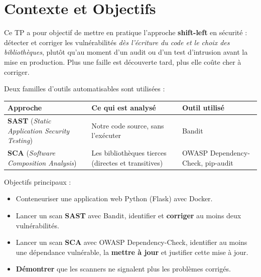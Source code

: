 \documentclass[11pt,a4paper]{article}
\begin{document}
\setcounter{page}{1}
\tableofcontents
\newpage

\section{Contexte et Objectifs}
Ce TP a pour objectif de mettre en pratique l'approche \textbf{\og shift-left \fg{}} en sécurité :
détecter et corriger les vulnérabilités \emph{dès l'écriture du code et le choix des bibliothèques},
plutôt qu'au moment d'un audit ou d'un test d'intrusion avant la mise en production. Plus une
faille est découverte tard, plus elle coûte cher à corriger.

Deux familles d'outils automatisables sont utilisées :

\begin{table}[H]
\centering
\begin{tabularx}{\textwidth}{@{}lLL@{}}
\toprule
\textbf{Approche} & \textbf{Ce qui est analysé} & \textbf{Outil utilisé} \\
\midrule
\textbf{SAST} (\emph{Static Application Security Testing}) & Notre code source, sans l'exécuter & Bandit \\
\textbf{SCA} (\emph{Software Composition Analysis}) & Les bibliothèques tierces (directes et transitives) & OWASP Dependency-Check, pip-audit \\
\bottomrule
\end{tabularx}
\end{table}

\noindent Objectifs principaux :
\begin{itemize}
  \item Conteneuriser une application web Python (Flask) avec Docker.
  \item Lancer un scan \textbf{SAST} avec Bandit, identifier et \textbf{corriger} au moins deux vulnérabilités.
  \item Lancer un scan \textbf{SCA} avec OWASP Dependency-Check, identifier au moins une dépendance
        vulnérable, la \textbf{mettre à jour} et justifier cette mise à jour.
  \item \textbf{Démontrer} que les scanners ne signalent plus les problèmes corrigés.
\end{itemize}

\end{document}
